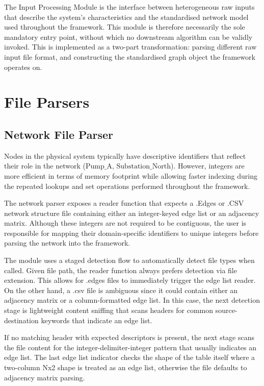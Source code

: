 \documentclass[12pt]{report}
\begin{document}
The Input Processing Module is the interface between heterogeneous raw inputs that describe the system's characteristics and the standardised network model used throughout the framework. This module is therefore necessarily the sole mandatory entry point, without which no downstream algorithm can be validly invoked. This is implemented as a two-part transformation: parsing different raw input file format, and constructing the standardised graph object the framework operates on.

\section{File Parsers}
\subsection{Network File Parser}

Nodes in the physical system typically have descriptive identifiers that reflect their role in the network ($\mathrm{Pump\_A}$, $\mathrm{Substation\_North}$). However, integers are more efficient in terms of memory footprint while allowing faster indexing during the repeated lookups and set operations performed throughout the framework.


The network parser exposes a reader function that expects a .Edges or .CSV network structure file containing either an integer-keyed edge list or an adjacency matrix. Although these integers are not required to be contiguous, the user is responsible for mapping their domain-specific identifiers to unique integers before parsing the network into the framework.

The module uses a staged detection flow to automatically detect file types when called. Given file path, the reader function always prefers detection via file extension. This allows for .edges files to immediately trigger the edge list reader. On the other hand, a .csv file is ambiguous since it could contain either an adjacency matrix or a column-formatted edge list. In this case, the next detection stage is lightweight content sniffing that scans headers for common source-destination keywords that indicate an edge list.

If no matching header with expected descriptors is present, the next stage scans the file content for the integer-delimiter-integer pattern that usually indicates an edge list. The last edge list indicator checks the shape of the table itself where a two-column Nx2 shape is treated as an edge list, otherwise the file defaults to adjacency matrix parsing.
\end{document}
